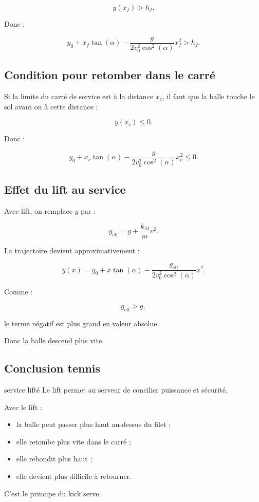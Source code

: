 \documentclass[11pt,a4paper]{article}
\begin{document}
\[
y(x_f)>h_f.
\]

Donc :

\[
y_0+x_f\tan(\alpha)-\frac{g}{2v_0^2\cos^2(\alpha)}x_f^2>h_f.
\]

\subsection{Condition pour retomber dans le carré}

Si la limite du carré de service est à la distance $x_c$, il faut que la balle touche le sol avant ou à cette distance :

\[
y(x_c)\leq 0.
\]

Donc :

\[
y_0+x_c\tan(\alpha)-\frac{g}{2v_0^2\cos^2(\alpha)}x_c^2\leq 0.
\]

\subsection{Effet du lift au service}

Avec lift, on remplace $g$ par :

\[
g_{\text{eff}}=g+\frac{k_M}{m}v^2.
\]

La trajectoire devient approximativement :

\[
y(x)=y_0+x\tan(\alpha)-\frac{g_{\text{eff}}}{2v_0^2\cos^2(\alpha)}x^2.
\]

Comme :

\[
g_{\text{eff}}>g,
\]

le terme négatif est plus grand en valeur absolue.

Donc la balle descend plus vite.

\subsection{Conclusion tennis}

\begin{tennis}{service lifté}
Le lift permet au serveur de concilier puissance et sécurité.

Avec le lift :
\begin{itemize}
    \item la balle peut passer plus haut au-dessus du filet ;
    \item elle retombe plus vite dans le carré ;
    \item elle rebondit plus haut ;
    \item elle devient plus difficile à retourner.
\end{itemize}

C'est le principe du kick serve.
\end{tennis}
\end{document}
